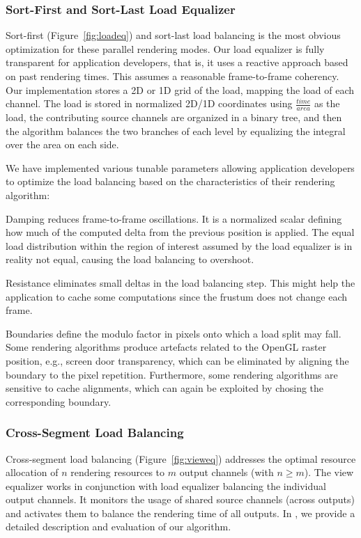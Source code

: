 \documentclass[10pt,journal,compsoc]{IEEEtran}
\newcommand{\fig}[1]{Figure~\ref{#1}}
\begin{document}
\subsubsection{Sort-First and Sort-Last Load Equalizer}

Sort-first (\fig{fig:loadeq}) and sort-last load balancing is the most obvious
optimization for these parallel rendering modes. Our load equalizer is fully
transparent for application developers, that is, it uses a reactive approach
based on past rendering times. This assumes a reasonable frame-to-frame
coherency. Our implementation stores a 2D or 1D grid of the load, mapping the
load of each channel. The load is stored in normalized 2D/1D coordinates using
$\frac{time}{area}$ as the load, the contributing source channels are organized
in a binary tree, and then the algorithm balances the two branches of each level
by equalizing the integral over the area on each side.

We have implemented various tunable parameters allowing application developers
to optimize the load balancing based on the characteristics of their rendering
algorithm:
\begin{compactdesc}
\item[Damping] reduces frame-to-frame oscillations. It is a normalized scalar
  defining how much of the computed delta from the previous position is
  applied. The equal load distribution within the region of interest assumed by
  the load equalizer is in reality not equal, causing the load balancing to
  overshoot.
\item[Resistance] eliminates small deltas in the load balancing step. This might
  help the application to cache some computations since the frustum does not
  change each frame.
\item[Boundaries] define the modulo factor in pixels onto which a load split may
  fall. Some rendering algorithms produce artefacts related to the OpenGL raster
  position, e.g., screen door transparency, which can be eliminated by aligning
  the boundary to the pixel repetition. Furthermore, some rendering algorithms
  are sensitive to cache alignments, which can again be exploited by chosing the
  corresponding boundary.
\end{compactdesc}

\subsubsection{Cross-Segment Load Balancing}

Cross-segment load balancing (\fig{fig:vieweq}) addresses the optimal resource
allocation of $n$ rendering resources to $m$ output channels (with $n\geq
m$). The view equalizer works in conjunction with load equalizer balancing the
individual output channels. It monitors the usage of shared source channels
(across outputs) and activates them to balance the rendering time of all
outputs. In \cite{EEP:11}, we provide a detailed description and evaluation of
our algorithm.
\end{document}
